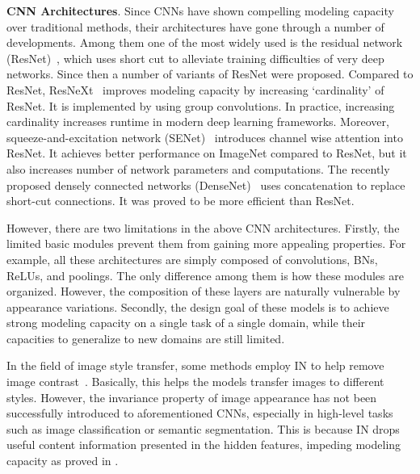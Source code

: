 \documentclass[runningheads]{llncs}
\begin{document}
\textbf{CNN Architectures}.
Since CNNs have shown compelling modeling capacity over traditional methods, their architectures have gone through a number of developments.
Among them one of the most widely used is the residual network (ResNet)~\cite{he2016deep}, which uses short cut to alleviate training difficulties of very deep networks.
Since then a number of variants of ResNet were proposed.
Compared to ResNet, ResNeXt~\cite{xie2017aggregated} improves modeling capacity by increasing `cardinality' of ResNet. It is implemented by using group convolutions.
In practice, increasing cardinality increases runtime in modern deep learning frameworks.
Moreover, squeeze-and-excitation network (SENet)~\cite{hu2017squeeze} introduces channel wise attention into ResNet.
It achieves better performance on ImageNet compared to ResNet, but it also increases number of network parameters and computations.
The recently proposed densely connected networks (DenseNet)~\cite{huang2017densely} uses concatenation to replace short-cut connections.
It was proved to be more efficient than ResNet.


However, there are two limitations in the above CNN architectures.
Firstly, the limited basic modules prevent them from gaining more appealing properties.
For example, all these architectures are simply composed of convolutions, BNs, ReLUs, and poolings.
The only difference among them is how these modules are organized.
However, the composition of these layers are naturally vulnerable by appearance variations.
Secondly, the design goal of these models is to achieve strong modeling capacity on a single task of a single domain, while their capacities to generalize to new domains are still limited.

In the field of image style transfer, some methods employ IN to help remove image contrast~\cite{ulyanov2017improved,dumoulin2016learned,huang2017arbitrary}.
Basically, this helps the models transfer images to different styles.
However, the invariance property of image appearance has not been successfully introduced to aforementioned CNNs, especially in high-level tasks such as image classification or semantic segmentation. 
This is because IN drops useful content information presented in the hidden features, impeding modeling capacity as proved in \cite{ulyanov2017improved}.
\end{document}
